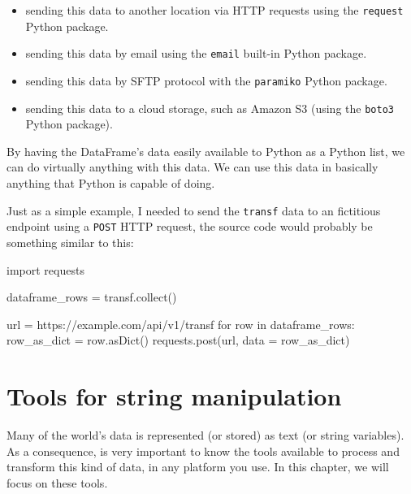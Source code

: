 \documentclass[
  11pt,
  letterpaper,
  DIV=11,
  numbers=noendperiod]{scrreprt}
\newenvironment{Shaded}{\begin{snugshade}}{\end{snugshade}}
\newcommand{\ControlFlowTok}[1]{\textcolor[rgb]{0.00,0.23,0.31}{#1}}
\newcommand{\ImportTok}[1]{\textcolor[rgb]{0.00,0.46,0.62}{#1}}
\newcommand{\KeywordTok}[1]{\textcolor[rgb]{0.00,0.23,0.31}{#1}}
\newcommand{\NormalTok}[1]{\textcolor[rgb]{0.00,0.23,0.31}{#1}}
\newcommand{\OperatorTok}[1]{\textcolor[rgb]{0.37,0.37,0.37}{#1}}
\newcommand{\StringTok}[1]{\textcolor[rgb]{0.13,0.47,0.30}{#1}}
\providecommand{\tightlist}{%
  \setlength{\itemsep}{0pt}\setlength{\parskip}{0pt}}\usepackage{longtable,booktabs,array}
\begin{document}
\begin{itemize}
\tightlist
\item
  sending this data to another location via HTTP requests using the
  \texttt{request} Python package.
\item
  sending this data by email using the \texttt{email} built-in Python
  package.
\item
  sending this data by SFTP protocol with the \texttt{paramiko} Python
  package.
\item
  sending this data to a cloud storage, such as Amazon S3 (using the
  \texttt{boto3} Python package).
\end{itemize}

By having the DataFrame's data easily available to Python as a Python
list, we can do virtually anything with this data. We can use this data
in basically anything that Python is capable of doing.

Just as a simple example, I needed to send the \texttt{transf} data to
an fictitious endpoint using a \texttt{POST} HTTP request, the source
code would probably be something similar to this:

\begin{Shaded}
\begin{Highlighting}[]
\ImportTok{import}\NormalTok{ requests}

\NormalTok{dataframe\_rows }\OperatorTok{=}\NormalTok{ transf.collect()}

\NormalTok{url }\OperatorTok{=} \StringTok{\textquotesingle{}https://example.com/api/v1/transf\textquotesingle{}}
\ControlFlowTok{for}\NormalTok{ row }\KeywordTok{in}\NormalTok{ dataframe\_rows:}
\NormalTok{    row\_as\_dict }\OperatorTok{=}\NormalTok{ row.asDict()}
\NormalTok{    requests.post(url, data }\OperatorTok{=}\NormalTok{ row\_as\_dict)}
\end{Highlighting}
\end{Shaded}


\hypertarget{sec-string-tools}{%
\chapter{Tools for string manipulation}\label{sec-string-tools}}

Many of the world's data is represented (or stored) as text (or string
variables). As a consequence, is very important to know the tools
available to process and transform this kind of data, in any platform
you use. In this chapter, we will focus on these tools.
\end{document}
